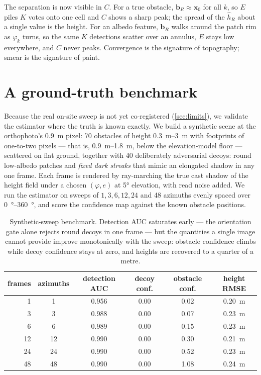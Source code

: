 \documentclass[11pt]{article}
\begin{document}
The separation is now visible in $C$. For a true obstacle, $\mathbf{b}_R\!\approx\!\mathbf{x}_0$
for all $k$, so $E$ piles $K$ votes onto one cell and $C$ shows a sharp peak; the spread of
the $\hat h_R$ about a single value is the height. For an albedo feature, $\mathbf{b}_R$
walks around the patch rim as $\varphi_k$ turns, so the same $K$ detections scatter over an
annulus, $E$ stays low everywhere, and $C$ never peaks. Convergence is the signature of
topography; smear is the signature of paint.

\section{A ground-truth benchmark}

Because the real on-site sweep is not yet co-registered (\cref{sec:limits}), we validate the
estimator where the truth is known exactly. We build a synthetic scene at the orthophoto's
\SI{0.9}{\meter} pixel: \num{70} obstacles of height \SIrange{0.3}{3}{\meter} with footprints
of one-to-two pixels --- that is, \SIrange{0.9}{1.8}{\meter}, below the elevation-model floor
--- scattered on flat ground, together with \num{40} deliberately adversarial decoys: round
low-albedo patches and \emph{fixed dark streaks} that mimic an elongated shadow in any one
frame. Each frame is rendered by ray-marching the true cast shadow of the height field under
a chosen $(\varphi,e)$ at \ang{5} elevation, with read noise added. We run the estimator on
sweeps of $1,3,6,12,24$ and \num{48} azimuths evenly spaced over \SIrange{0}{360}{\degree},
and score the confidence map against the known obstacle positions.

\begin{table}[h]
\centering\small
\caption{Synthetic-sweep benchmark. Detection AUC saturates early --- the orientation gate
alone rejects round decoys in one frame --- but the quantities a single image cannot provide
improve monotonically with the sweep: obstacle confidence climbs while decoy confidence
stays at zero, and heights are recovered to a quarter of a metre.}
\label{tab:bench}
\begin{tabular}{rccccc}
\toprule
frames & azimuths & detection AUC & decoy conf. & obstacle conf. & height RMSE \\
\midrule
1  & 1  & 0.956 & 0.00 & 0.02 & \SI{0.20}{\meter} \\
3  & 3  & 0.988 & 0.00 & 0.07 & \SI{0.23}{\meter} \\
6  & 6  & 0.989 & 0.00 & 0.15 & \SI{0.23}{\meter} \\
12 & 12 & 0.990 & 0.00 & 0.30 & \SI{0.21}{\meter} \\
24 & 24 & 0.990 & 0.00 & 0.52 & \SI{0.23}{\meter} \\
48 & 48 & 0.990 & 0.00 & 1.08 & \SI{0.24}{\meter} \\
\bottomrule
\end{tabular}
\end{table}
\end{document}

